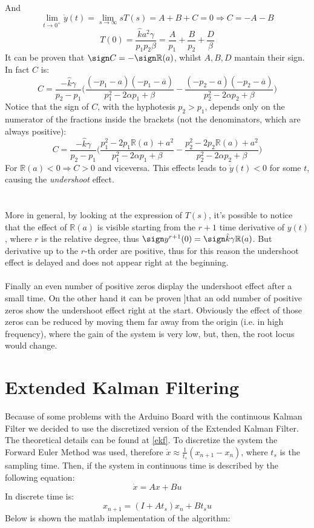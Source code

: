 And $$\lim_{t \to 0^{+}} \dot{y}(t) = \lim_{s \to \infty} sT(s) = A+B+C=0 \Rightarrow C=-A-B$$
$$T(0)= \frac{\hat{k}a^2\gamma}{p_1 p_2 \beta } = \frac{A}{p_1} + \frac{B}{p_2} + \frac{D}{\beta}$$
It can be proven that $\sign C =  - \sign \mathbb{R}(a)$, whilst $A,B,D$ mantain their sign. In fact $C$ is:
$$C=\frac{-\hat{k}\gamma}{p_2-p_1} \Big( \frac{(-p_1-a)(-p_1-\overline{a})}{p_1^2-2\alpha p_1+\beta} -\frac{(-p_2-a)(-p_2-\overline{a})}{p_2^2-2\alpha p_2+\beta} \Big) $$
Notice that the sign of $C$, with the hyphotesis $p_2 > p_1$, depends only on the numerator of the fractions inside the brackets (not the denominators, which are always positive):
$$C=\frac{-\hat{k}\gamma}{p_2-p_1}\Big ( \frac{p_1^2 -2p_1 \mathbb{R}(a) +a^2}{p_1^2-2\alpha p_1+\beta} -\frac{p_2^2 -2p_2 \mathbb{R}(a) +a^2}{p_2^2-2\alpha p_2+\beta} \Big)$$
For $\mathbb{R}(a) < 0 \Rightarrow C > 0$ and viceversa. This effects leads to $\dot{y}(t) <0$ for some $t$, causing the \emph{undershoot} effect.  \\ \\ \\
More in general, by looking at the expression of $T(s)$, it's possible to notice that the effect of $\mathbb{R}(a)$ is visible starting from the $r+1$ time derivative of $y(t)$, where $r$ is the relative degree, thus $\sign y^{r+1}(0)  = \sign \hat{k}\gamma \mathbb{R}(a)$. But derivative up to the $r$-th order are positive, thus for this reason the undershoot effect is delayed and does not appear right at the beginning. \\ \\
Finally an even number of positive zeros display the undershoot effect  after a small time. On the other hand it can be proven  \cite{hoagg2006}]that an odd number of positive zeros show the undershoot effect right at the start. Obviously the effect of those zeros can be reduced by moving them far away from the origin (i.e. in high frequency), where the gain of the system is very low,  but, then, the root locus would change. \\

\section{Extended Kalman Filtering}
Because of some problems with the Arduino Board with the continuous Kalman Filter we decided to use the discretized version of the Extended Kalman Filter. The theoretical details can be found at \ref{ekf}. To discretize the system the Forward Euler Method was used, therefore $\dot{x} \approx \frac{1}{t_s}(x_{n+1}-x_{n})$, where $t_s$ is the sampling time. Then, if the system in continuous time is described by the following equation:
\begin{equation}
\dot{x}=Ax+Bu
\end{equation}
In discrete time is:
\begin{equation}
x_{n+1}=(I+At_s)x_n + B t_s u
\end{equation}
Below is shown the matlab implementation of the algorithm:

